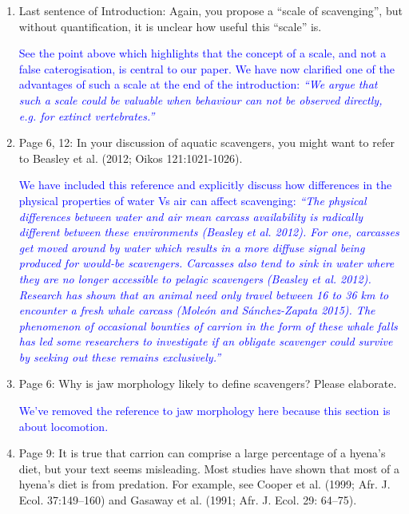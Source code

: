 \documentclass[12pt,letterpaper]{article}
\begin{document}
\begin{enumerate}
\item{Last sentence of Introduction: Again, you propose a ``scale of scavenging'', but without quantification, it is unclear how useful this ``scale'' is.}

\textcolor{blue}{See the point above which highlights that the concept of a scale, and not a false caterogisation, is central to our paper. We have now clarified one of the advantages of such a scale at the end of the introduction: \textit{``We argue that such a scale could be valuable when behaviour can not be observed directly, e.g. for extinct vertebrates.''}}

\item{Page 6, 12: In your discussion of aquatic scavengers, you might want to refer to Beasley et al. (2012; Oikos 121:1021-1026).}

\textcolor{blue}{We have included this reference and explicitly discuss how differences in the physical properties of water Vs air can affect scavenging: \textit{``The physical differences between water and air mean carcass availability is radically different between these environments (Beasley et al. 2012). For one, carcasses get moved around by water which results in a more diffuse signal being produced for would-be scavengers. Carcasses also tend to sink in water where they are no longer accessible to pelagic scavengers (Beasley et al. 2012). Research has shown that an animal need only travel between 16 to 36 km to encounter a fresh whale carcass  (Mole\'{o}n and Sánchez-Zapata 2015). The phenomenon of occasional bounties of carrion in the form of these whale falls has led some researchers to investigate if an obligate scavenger could survive by seeking out these remains exclusively.''}}

\item{Page 6: Why is jaw morphology likely to define scavengers?  Please elaborate.}

\textcolor{blue}{We've removed the reference to jaw morphology here because this section is about locomotion.}

\item{Page 9: It is true that carrion can comprise a large percentage of a hyena's diet, but your text seems misleading. Most studies have shown that most of a hyena's diet is from predation. For example, see Cooper et al. (1999; Afr. J. Ecol. 37:149–160) and Gasaway et al. (1991; Afr. J. Ecol. 29: 64–75).}


\end{enumerate}
\end{document}
